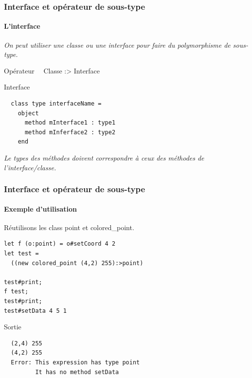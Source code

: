 \begin{frame}[fragile]
	\frametitle{Interface et opérateur de sous-type}
	\framesubtitle{L'interface}
	\textit{On peut utiliser une classe ou une interface pour faire du polymorphisme de sous-type.}
	\begin{block}{Opérateur}
		~~Classe :> Interface
	\end{block}
	\begin{block}{Interface}
		\begin{lstlisting}
  class type interfaceName =
    object
      method mInterface1 : type1
      method mInferface2 : type2
    end
		\end{lstlisting}
	\end{block}
	\textit{Le types des méthodes doivent correspondre à ceux des méthodes de l'interface/classe.}
\end{frame}

\begin{frame}[fragile]
	\frametitle{Interface et opérateur de sous-type}
	\framesubtitle{Exemple d'utilisation}
	Réutilisons les class point et colored\_point.
	\begin{lstlisting}
let f (o:point) = o#setCoord 4 2
let test = 
  ((new colored_point (4,2) 255):>point)

test#print;
f test;
test#print;
test#setData 4 5 1
	\end{lstlisting}
	\begin{block}{Sortie}
		\begin{lstlisting}
  (2,4) 255
  (4,2) 255
  Error: This expression has type point
         It has no method setData
		\end{lstlisting}
	\end{block}
\end{frame}
